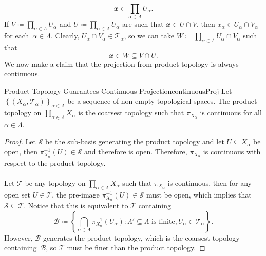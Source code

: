 \documentclass[math]{amznotes}
\theoremstyle{remark}
\begin{document}
\begin{equation*}
    \mathbfit{x} \in \prod_{\alpha \in \Lambda}U_{\alpha}.
\end{equation*}
If $V \coloneqq \prod_{\alpha \in \Lambda}U_{\alpha}$ and $U \coloneqq \prod_{\alpha \in \Lambda}U_{\alpha}$ are such that $\mathbfit{x} \in U \cap V$, then $x_{\alpha} \in U_{\alpha} \cap V_{\alpha}$ for each~$\alpha \in \Lambda$. Clearly, $U_{\alpha} \cap V_{\alpha} \in \mathcal{T}_{\alpha}$, so we can take $W \coloneqq \prod_{\alpha \in \Lambda}U_{\alpha} \cap V_{\alpha}$ such that 
\begin{equation*}
    \mathbfit{x} \in W \subseteq V \cap U.
\end{equation*}
We now make a claim that the projection from product topology is always continuous.
\begin{probox}{Product Topology Guarantees Continuous Projection}{continuousProj}
    Let $\left\{\left(X_{\alpha}, \mathcal{T}_{\alpha}\right)\right\}_{\alpha \in \Lambda}$ be a sequence of non-empty topological spaces. The product topology on $\prod_{\alpha \in \Lambda}X_{\alpha}$ is the coarsest topology such that $\pi_{X_{\alpha}}$ is continuous for all $\alpha \in \Lambda$.
    \tcblower
    \begin{proof}
        Let $\mathcal{S}$ be the sub-basis generating the product topology and let $U \subseteq X_{\alpha}$ be open, then $\pi^{-1}_{X_{\alpha}}\left(U\right) \in \mathcal{S}$ and therefore is open. Therefore, $\pi_{X_{\alpha}}$ is continuous with respect to the product topology.
        \\\\
        Let $\mathcal{T}$ be any topology on $\prod_{\alpha \in \Lambda}X_{\alpha}$ such that $\pi_{X_{\alpha}}$ is continuous, then for any open set $U \in \mathcal{T}$, the pre-image $\pi^{-1}_{X_{\alpha}}\left(U\right) \in \mathcal{S}$ must be open, which implies that $\mathcal{S} \subseteq \mathcal{T}$. Notice that this is equivalent to $\mathcal{T}$ containing 
        \begin{equation*}
            \mathcal{B} \coloneqq \left\{\bigcap_{\alpha \in \Lambda}\pi^{-1}_{X_{\alpha}}\left(U_{\alpha}\right) \colon \Lambda' \subseteq \Lambda \textrm{ is finite}, U_{\alpha} \in \mathcal{T}_{\alpha}\right\}.
        \end{equation*}
        However, $\mathcal{B}$ generates the product topology, which is the coarsest topology containing~$\mathcal{B}$, so $\mathcal{T}$ must be finer than the product topology.
    \end{proof}
\end{probox}
\end{document}
